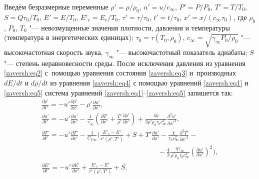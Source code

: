 Введём безразмерные переменные $\rho' =\rho /\rho _{0} $,  $u'=u/c_{\infty } $,
$P'=P/P_{0} $,  $T'=T/T_{0} $,  $S=Q\tau _{0} /T_{0} $,  $E' =E
/T_{0} $,  $E'_{e} =E_{e} /T_{0} $,  $\tau'=\tau /\tau _{0} $,
$t'=t/\tau _{0} $,  $x'=x/(c_{\infty } \tau _{0} )$, где $\rho
_0$, $P_0$, $T_0$  "--- невозмущенные значения плотности, давления
и температуры (температура в энергетических единицах); $\tau _{0}
=\tau(T_0,\rho _0)$,  $c_{\infty } =\sqrt{\gamma _{\infty } P_0
/\rho _0 } $ "--- высокочастотная скорость звука,  $\gamma _\infty
$  "--- высокочастотный показатель адиабаты;  $S$  "--- степень
неравновесности среды. 
После исключения давления из уравнения
\eqref{zaversh:eq2} с~помощью уравнения состояния \eqref{zaversh:eq3} 
и~производных  ${dE }/{dt} $  и  ${d\rho}/{dt} $  из уравнения \eqref{zaversh:eq4} с помощью уравнений
\eqref{zaversh:eq1} и \eqref{zaversh:eq5} система уравнений
\eqref{zaversh:eq1}--\eqref{zaversh:eq5} запишется так:
\begin{equation}
\begin{array}{l}
\displaystyle \frac{\partial \rho'}{\partial t'} =-u'\frac{\partial \rho
'}{\partial x'} -\rho'\frac{\partial u'}{\partial
x'},\\[2mm]
\displaystyle 
\frac{\partial u'}{\partial t'} =-u'\frac{\partial u'}{\partial
x'} -\frac{1}{\gamma _{\infty } } \left(\frac{\partial
T'}{\partial x'} +\frac{T'}{\rho'} \frac{\partial \rho'}{\partial
x'} \right)+\frac{4\eta }{3\rho'\rho _{0} \tau _{0} c_{\infty
}^{2} } \frac{\partial ^{2} u'}{\partial x'^{2}}, \\[2mm]
\displaystyle 
\frac{\partial T'}{\partial t'} =-u'\frac{\partial
T'}{\partial x'} - \frac{1}{C_{V\infty } } \biggl(\frac{E'_{e} -E'
}{\tau' \left(\rho',T'\right)} +S+T'\frac{\partial u'}{\partial
x'} -\frac{\chi }{\tau _0 c_\infty^2} \frac{\partial^2
T'}{\partial
x'^2 } -\\[2mm] 
\hspace{7cm}
\displaystyle - 
\frac{4}{3} \frac{\eta \gamma _\infty}{\rho' \rho _0 \tau
_0 c_\infty^2} \left(\frac{\partial u'}{\partial x'} \right)^2
\biggr),\\[2mm]
\displaystyle 
\frac{\partial E'}{\partial t'} =-u'\frac{\partial E' }{\partial
x'} +\frac{E'_e -E' }{\tau'\left(\rho',T'\right)}+S.
\end{array}
 \label{zaversh:eq14}
\end{equation}

